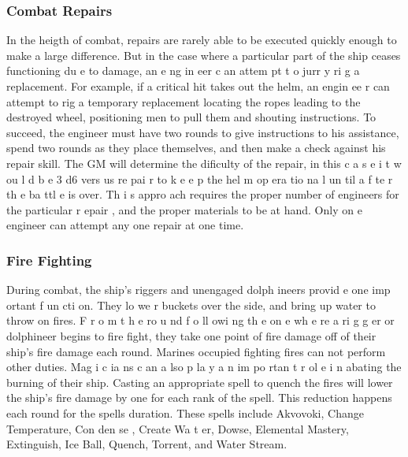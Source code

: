 \begin{multicols*}{2}
\subsubsection{Combat Repairs}
In the heigth of combat, repairs are rarely able to be
executed quickly enough to make a large difference. But in
the case where a particular part of the ship ceases functioning
du e to damage, an e ng in eer c an attem pt t o jurr y ri g a
replacement. For example, if a critical hit takes out the helm,
an engin ee r can attempt to rig a temporary replacement
locating the ropes leading to the destroyed wheel, positioning
men to pull them and shouting instructions.
To succeed, the engineer must have two rounds to
give instructions to his assistance, spend two rounds as they
place themselves, and then make a check against his repair
skill. The GM will determine the dificulty of the repair, in this
c a s e i t w ou l d b e 3 d6 vers us re pai r to k e e p the hel m
op era tio na l un til a f te r th e ba ttl e is over. Th i s appro ach
requires the proper number of engineers for the particular
r epair , and the proper materials to be at hand. Only on e
engineer can attempt any one repair at one time.
\subsubsection{Fire Fighting}
During combat, the ship’s riggers and unengaged
dolph ineers provid e one imp ortant f un cti on. They lo we r
buckets over the side, and bring up water to throw on fires.
F r o m t h e ro u nd f o ll owi ng th e on e wh e re a ri g g er or
dolphineer begins to fire fight, they take one point of fire
damage off of their ship’s fire damage each round. Marines
occupied fighting fires can not perform other duties.
Mag i c ia ns c an a lso p la y a n im po rtan t r ol e i n
abating the burning of their ship. Casting an appropriate spell
to quench the fires will lower the ship’s fire damage by one
for each rank of the spell. This reduction happens each round
for the spells duration. These spells include Akvovoki, Change
Temperature, Con den se , Create Wa t er, Dowse, Elemental
Mastery, Extinguish, Ice Ball, Quench, Torrent, and Water
Stream.

\end{multicols*}
